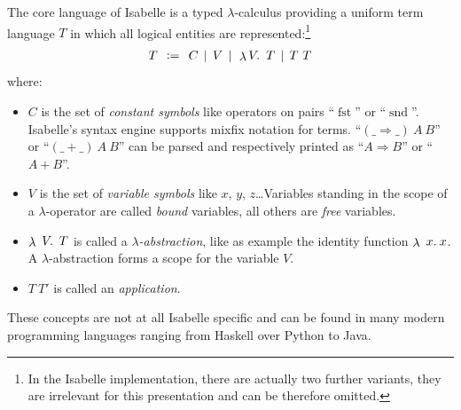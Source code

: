 The core language of Isabelle is a typed $\lambda$-calculus providing
a uniform term language $T$ in which all logical entities are
represented:\footnote{In the Isabelle implementation, there are
  actually two further variants, they are irrelevant for this
  presentation and can be therefore omitted.}
\begin{gather*}
   T \ap\ap \defeq \ap\ap C \ap\ap|\ap\ap V \ap\ap|\ap\ap \lambda V\spot\ap T \ap\ap|\ap\ap T~T
\end{gather*}
where:
\begin{itemize}
\item $C$ is the set of \emph{constant symbols} like operators on
  pairs ``$\operatorname{fst}$'' or
  ``$\operatorname{snd}$''. Isabelle's syntax engine supports mixfix
  notation for terms. ``$(\_ \Longrightarrow \_)~A~B$'' or ``$(\_ +
  \_)~A~B$'' can be parsed and respectively printed as ``$A
  \Longrightarrow B$'' or ``$A + B$''.
\item $V$ is the set of \emph{variable symbols} like $x$, $y$,
  $z$\ldots Variables standing in the scope of a $\lambda$-operator
  are called \emph{bound} variables, all others are \emph{free}
  variables.
\item $\lambda~V\spot \ap T$ is called a \emph{$\lambda$-abstraction}, like as
  example the identity function $\lambda~x. \ap x$. A
  $\lambda$-abstraction forms a scope for the variable $V$.
\item $T~T'$ is called an \emph{application}.  
\end{itemize}
These concepts are not at all Isabelle specific and can be found in many modern programming
languages ranging from Haskell over Python to Java.

